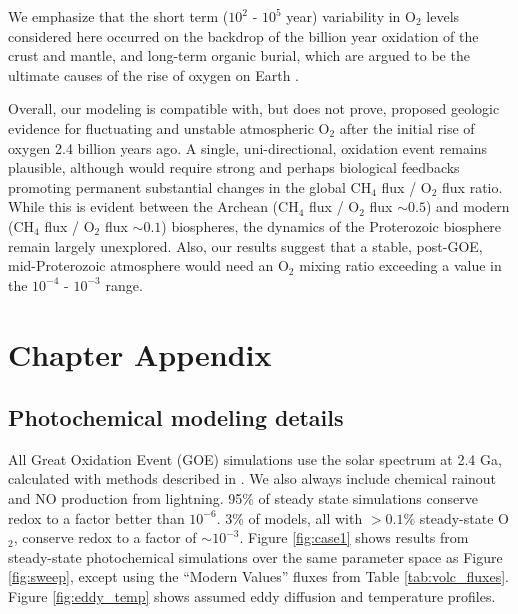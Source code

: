 We emphasize that the short term ($10^2$ - $10^5$ year) variability in O$_2$ levels considered here occurred on the backdrop of the billion year oxidation of the crust and mantle, and long-term organic burial, which are argued to be the ultimate causes of the rise of oxygen on Earth \citep[e.g.][]{Catling_2001}.

Overall, our modeling is compatible with, but does not prove, proposed geologic evidence for fluctuating and unstable atmospheric O$_2$ after the initial rise of oxygen 2.4 billion years ago. A single, uni-directional, oxidation event remains plausible, although would require strong and perhaps biological feedbacks promoting permanent substantial changes in the global CH$_4$ flux / O$_2$ flux ratio. While this is evident between the Archean (CH$_4$ flux / O$_2$ flux $\sim 0.5$) and modern (CH$_4$ flux / O$_2$ flux $\sim 0.1$) biospheres, the dynamics of the Proterozoic biosphere remain largely unexplored. Also, our results suggest that a stable, post-GOE, mid-Proterozoic atmosphere would need an O$_2$ mixing ratio exceeding a value in the $10^{-4}$ - $10^{-3}$ range. 

\section{Chapter Appendix} \label{sec:goe_appendix}

\subsection{Photochemical modeling details} \label{sec:goe_appendix1}

All Great Oxidation Event (GOE) simulations use the solar spectrum at 2.4 Ga, calculated with methods described in \citet{Claire_2012}. We also always include chemical rainout and NO production from lightning. 95\% of steady state simulations conserve redox to a factor better than $10^{-6}$. 3\% of models, all with $> 0.1\%$ steady-state O$_2$, conserve redox to a factor of $\sim10^{-3}$. Figure \ref{fig:case1} shows results from steady-state photochemical simulations over the same parameter space as Figure \ref{fig:sweep}, except using the ``Modern Values'' fluxes from Table \ref{tab:volc_fluxes}. Figure \ref{fig:eddy_temp} shows assumed eddy diffusion and temperature profiles. 

